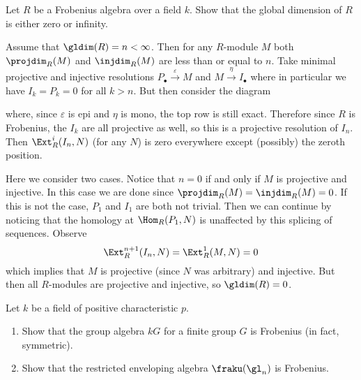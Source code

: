 \documentclass[12pt]{article}
\begin{document}
\begin{prob}
	Let $R$ be a Frobenius algebra over a field $k$. Show that the global dimension of $R$ is either zero or infinity.
\end{prob}
\begin{sol}
	Assume that $\gldim(R)=n<\infty$. Then for any $R$-module $M$ both $\projdim_R(M)$ and $\injdim_R(M)$
	are less than or equal to $n$. Take minimal projective and injective resolutions $P_\bullet\xrightarrow{\varepsilon} M$ and $M\xrightarrow{\eta} I_\bullet$
	where in particular we have $I_k=P_k=0$ for all $k>n.$ But then consider the diagram 
	\begin{center}
	\end{center}
	where, since $\varepsilon$ is epi and $\eta$ is mono, the top row is still exact. Therefore since $R$ is Frobenius, 
	the $I_k$ are all projective as well, so this is a projective resolution of $I_n$. Then $\Ext^i_R(I_n,N)$ (for any $N$)
	is zero everywhere except (possibly) the zeroth position.

	Here we consider two cases. Notice that $n=0$ if and only if $M$ is projective and injective. In this case we are done since $\projdim_R(M)=\injdim_R(M)=0$. If this is not the case, 
	$P_1$ and $I_1$ are both not trivial. Then we can continue by noticing that the homology at $\Hom_R(P_1,N)$ is unaffected 
	by this splicing of sequences. Observe 
	\[\Ext_R^{n+1}(I_n,N)=\Ext_R^1(M,N)=0\]
	which implies that $M$ is projective (since $N$ was arbitrary) and injective. But then all $R$-modules are projective and injective,
	so $\gldim(R)=0$.
\end{sol}

\begin{prob}
	Let $k$ be a field of positive characteristic $p$. 
	\begin{enumerate} 
		\item Show that the group algebra $kG$ for a finite group $G$ is Frobenius (in fact, symmetric). 
		\item Show that the restricted enveloping algebra $\fraku(\gl_n)$ is Frobenius. 
	\end{enumerate} 
\end{prob}
\begin{sol}

\end{sol}
\end{document}
